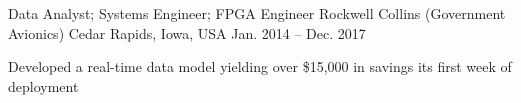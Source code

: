 \begin{cventries}
  \cventry
    {Data Analyst; Systems Engineer; FPGA Engineer} %
    {Rockwell Collins (Government Avionics)} %
    {Cedar Rapids, Iowa, USA} %
    {Jan. 2014 -- Dec. 2017} %
    {
      \begin{cvitems} %
        \item {Developed a real-time data model yielding over \$15,000 in savings its first week of deployment}
      \end{cvitems}
    }

\end{cventries}
